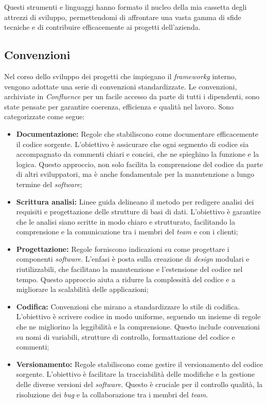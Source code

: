 Questi strumenti e linguaggi hanno formato il nucleo della mia cassetta degli attrezzi di sviluppo, permettendomi di affrontare una vasta gamma di sfide tecniche e di contribuire efficacemente 
ai progetti dell'azienda.

\subsection{Convenzioni}
Nel corso dello sviluppo dei progetti che impiegano il \textit{frameworkg} interno, vengono adottate una serie di convenzioni standardizzate. 
Le convenzioni, archiviate in \textit{Confluence} per un facile accesso da parte di tutti i dipendenti, 
sono state pensate per garantire coerenza, efficienza e qualità nel lavoro. Sono categorizzate come segue:

\begin{itemize}
\item \textbf{Documentazione:} Regole che stabiliscono come documentare efficacemente il codice sorgente. 
L'obiettivo è assicurare che ogni segmento di codice sia accompagnato da commenti chiari e concisi, che ne spieghino la funzione e la logica. 
Questo approccio, non solo facilita la comprensione del codice da parte di altri sviluppatori, ma è anche fondamentale per la manutenzione a lungo termine del \textit{software};

\item \textbf{Scrittura analisi:} Linee guida delineano il metodo per redigere analisi dei requisiti e progettazione delle strutture di basi di dati. 
L'obiettivo è garantire che le analisi siano scritte in modo chiaro e strutturato, facilitando la comprensione e la comunicazione tra i membri del \textit{team} e con i clienti;

\item \textbf{Progettazione:} Regole forniscono indicazioni su come progettare i componenti \textit{software}. 
L'enfasi è posta sulla creazione di \textit{design} modulari e riutilizzabili, che facilitano la manutenzione e l'estensione del codice nel tempo. 
Questo approccio aiuta a ridurre la complessità del codice e a migliorare la scalabilità delle applicazioni;

\item \textbf{Codifica:} Convenzioni che mirano a standardizzare lo stile di codifica. L'obiettivo è scrivere codice in modo uniforme, seguendo un insieme di regole che ne migliorino la leggibilità e la comprensione. Questo include convenzioni su nomi di variabili, strutture di controllo, formattazione del codice e commenti;

\item \textbf{Versionamento:} Regole stabiliscono come gestire il versionamento del codice sorgente. 
L'obiettivo è facilitare la tracciabilità delle modifiche e la gestione delle diverse versioni del \textit{software}. 
Questo è cruciale per il controllo qualità, la risoluzione dei \textit{bug} e la collaborazione tra i membri del \textit{team}.
\end{itemize}

